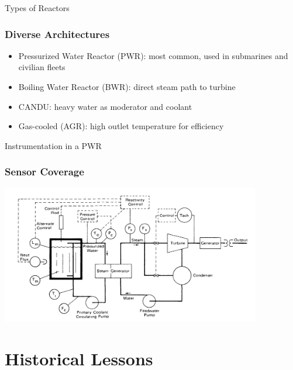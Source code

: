 \documentclass{beamer}
\begin{document}
\begin{frame}{Types of Reactors}
  \subsubsection*{Diverse Architectures}
  \begin{itemize}
    \item Pressurized Water Reactor (PWR): most common, used in submarines and civilian fleets
    \item Boiling Water Reactor (BWR): direct steam path to turbine
    \item CANDU: heavy water as moderator and coolant
    \item Gas-cooled (AGR): high outlet temperature for efficiency
  \end{itemize}
\end{frame}

\begin{frame}{Instrumentation in a PWR}
  \subsubsection*{Sensor Coverage}
  \includegraphics[width=0.85\textwidth]{instrumentation.png}
\end{frame}

\section{Historical Lessons}
\end{document}
